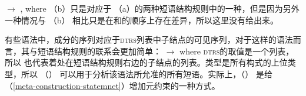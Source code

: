 \ex 
{} $\to$ ,  where 
\zl
（b）只是对应于 （a）的两种短语结构规则中的一种，但是因为另外一种情况与 （b） 相比只是在和的顺序上存在差异，所以这里没有给出来。

有些语法中，成分的序列对应于\textsc{dtrs}列表中子结点的可见序列，对于这样的语法而言，其与短语结构规则的联系会更加简单：
\ea 
{} $\to$  where 
\z
\textsc{dtrs}的取值是一个列表，所以 也代表着处在短语结构规则右边的子结点的列表。类型是所有构式的上位类型，所以 （） 可以用于分析该语法所允准的所有短语。实际上，（） 是给 （\ref{meta-construction-statemnet}）增加元约束的一种方式。

